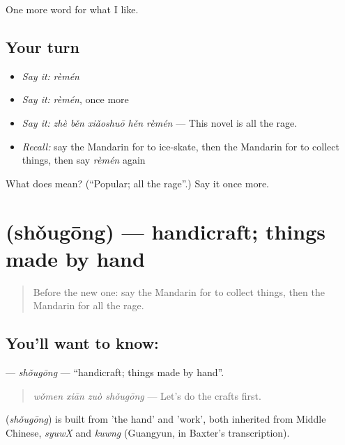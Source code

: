 \begin{grammarlens}[title={What you've built}]
One more word for what I like.
\end{grammarlens}

\subsection*{Your turn}
\begin{itemize}
\raggedright
  \item \emph{Say it:} \emph{rèmén}
  \item \emph{Say it:} \emph{rèmén}, once more
  \item \emph{Say it:} \emph{zhè běn xiǎoshuō hěn rèmén} — This novel is all the rage.
  \item \emph{Recall:} say the Mandarin for to ice-skate, then the Mandarin for to collect things, then say \emph{rèmén} again
\end{itemize}

\begin{tcolorbox}[breakable,colback=teal!4,colframe=teal!35!black,title={Before you move on}]
What does  mean? (\textquotedblleft{}Popular; all the rage\textquotedblright{}.) Say it once more.
\end{tcolorbox}
\section[\texorpdfstring{\zh{手工} (shǒugōng)}{手工 (shǒugōng)}]{ (shǒugōng) — handicraft; things made by hand}

\label{lesson:ZH-C274-shougong}



\begin{quote}
Before the new one: say the Mandarin for to collect things, then the Mandarin for all the rage.
\end{quote}

\subsection*{You'll want to know: }
\textbf{} — \emph{shǒugōng} — \textquotedblleft{}handicraft; things made by hand\textquotedblright{}.

\begin{quote}
\textbf{} \emph{wǒmen xiān zuò shǒugōng} — Let's do the crafts first.
\end{quote}

\begin{cousinweb}
\textbf{} (\emph{shǒugōng}) is built from  'the hand' and  'work', both inherited from Middle Chinese, \emph{syuwX} and \emph{kuwng} (Guangyun, in Baxter's transcription).
\end{cousinweb}

